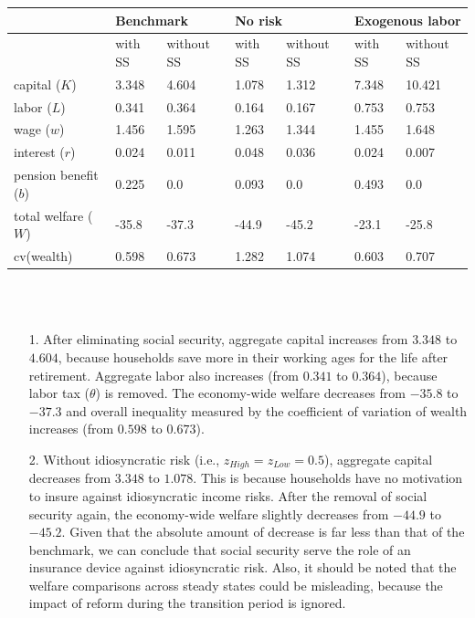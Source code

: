 \documentclass[11pt]{article} %
\begin{document}
\begin{itemize}
		\begin{tabular}{l|l|l|l|l|l|l} 
			\hline
			& \multicolumn{2}{l|}{Benchmark} & \multicolumn{2}{l|}{No risk} & \multicolumn{2}{l}{Exogenous labor}  \\ 
			\hline
			& with SS & without SS           & with SS & without SS         & with SS & without SS                 \\ 
			\hline
			capital ($K$)         & 3.348   & 4.604                & 1.078    & 1.312              & 7.348   & 10.421                     \\ 
			labor ($L$)           & 0.341   & 0.364                & 0.164   & 0.167              & 0.753   & 0.753                      \\ 
			wage ($w$)            & 1.456   & 1.595                & 1.263   & 1.344              & 1.455   & 1.648                      \\
			interest ($r$)        & 0.024   & 0.011                & 0.048   & 0.036              & 0.024   & 0.007                      \\
			pension benefit ($b$) & 0.225   & 0.0                  & 0.093   & 0.0                & 0.493   & 0.0                        \\
			total welfare ($W$)   & -35.8   & -37.3                & -44.9   & -45.2              & -23.1   & -25.8                      \\
			cv(wealth)        & 0.598   & 0.673                & 1.282   & 1.074              & 0.603   & 0.707                      \\
			\hline
		\end{tabular}
\\
~\\
\begin{itemize}
	\item[1.] After eliminating social security, aggregate capital increases from $3.348$ to $4.604$, because households save more in their working ages for the life after retirement. Aggregate labor also increases (from $0.341$ to $0.364$), because labor tax ($\theta$) is removed. The economy-wide welfare decreases from $-35.8$ to $-37.3$ and overall inequality measured by the coefficient of variation of wealth increases (from $0.598$ to $0.673$).
	
	\item[2.] Without idiosyncratic risk (i.e., $z_{High} = z_{Low} = 0.5$), aggregate capital decreases from $3.348$ to $1.078$. This is because households have no motivation to insure against idiosyncratic income risks. After the removal of social security again, the economy-wide welfare slightly decreases from $-44.9$ to $-45.2$. Given that the absolute amount of decrease is far less than that of the benchmark, we can conclude that social security serve the role of an insurance device against idiosyncratic risk. Also, it should be noted that the welfare comparisons across steady states could be misleading, because the impact of reform during the transition period is ignored. 
	

\end{itemize}
\end{itemize}
\end{document}

